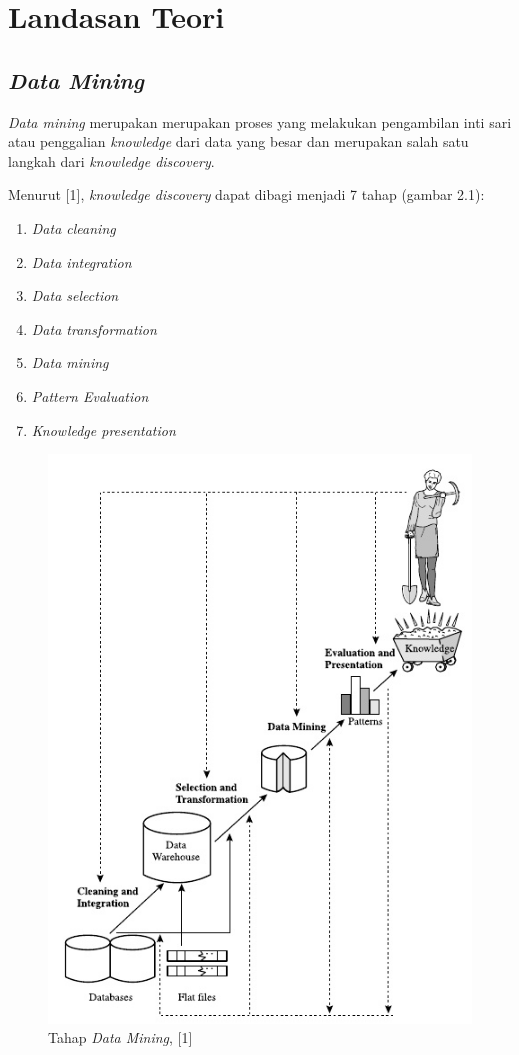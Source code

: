 \chapter{Landasan Teori}
\label{chap:definition}

\section{\textsl{Data Mining}}

\textsl{Data mining} merupakan merupakan proses yang melakukan pengambilan inti sari atau penggalian \textsl{knowledge} dari data yang besar dan merupakan salah satu langkah dari \textsl{knowledge discovery}.

Menurut [1], \textsl{knowledge discovery} dapat dibagi menjadi 7 tahap (gambar 2.1):
\begin{enumerate}
	\item \textsl{Data cleaning}
	\item \textsl{Data integration}
	\item \textsl{Data selection}
	\item \textsl{Data transformation}
	\item \textsl {Data mining}
	\item \textsl{Pattern Evaluation}
	\item \textsl{Knowledge presentation}
\end{enumerate}

\begin{figure}
\includegraphics[scale=1]{Gambar/tahapdatamining.jpg}
\caption[Tahap \textsl{Data Mining}]{Tahap \textsl{Data Mining}, [1]} 
\end{figure}

